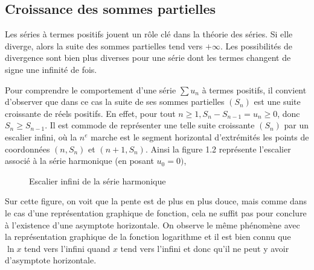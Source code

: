 \documentclass{book}
\begin{document}
\subsection{Croissance des sommes partielles}
Les séries à termes positifs jouent un rôle clé dans la théorie des séries. Si elle diverge, alors la suite des sommes partielles tend vers $+\infty$. Les
possibilités de divergence sont bien plus diverses pour une série dont les termes changent de signe une infinité de fois.

Pour comprendre le comportement d'une série $\sum u_n$ à termes positifs, il convient d'observer que dans ce cas la suite de ses sommes partielles $(S_n)$ est une suite croissante de réels positifs. En effet, pour tout $n \geq 1 , S_n - S_{n-1}= u_n \geq  0$, donc $S_n \geq S_{n-1}$. Il est commode de représenter une telle suite croissante $(S_n)$ par un escalier infini, où la $n^e$ marche est
le segment horizontal d'extrémités les points de coordonnées $(n, S_n)$ et $(n+1, S_n)$. Ainsi la figure 1.2 représente  l'escalier associé à la série harmonique
(en posant $u_0 = 0)$,
\begin{figure}[!h]
\begin{center}
\caption{Escalier infini de la série harmonique}
\end{center}
\end{figure}


Sur cette figure, on voit que la pente est de plus en plus douce, mais comme dans le cas
d'une représentation graphique de fonction, cela ne suffit pas pour conclure à l'existence
d'une asymptote horizontale. On observe le même phénomène avec la représentation graphique de la fonction logarithme et il est bien connu que $\ln x$ tend vers l'infini quand $x$
tend vers l'infini et donc qu'il ne peut y avoir d'asymptote horizontale.
\end{document}

